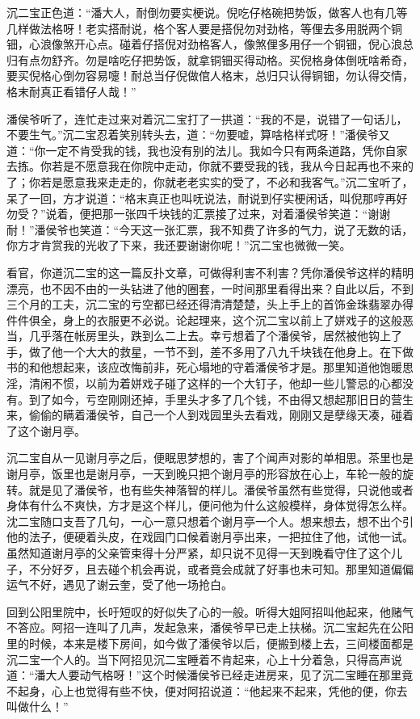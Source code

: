 \documentclass[12pt,UTF8]{ctexbook}
\begin{document}
{{{沉二宝正色道：“潘大人，耐倒勿要实梗说。倪吃仔格碗把势饭，做客人也有几等几样做法格呀！老实搭耐说，格个客人要是搭倪勿对劲格，等俚去多用脱两个铜钿，心浪像煞开心点。碰着仔搭倪对劲格客人，像煞俚多用仔一个铜钿，倪心浪总归有点勿舒齐。勿是啥吃仔把势饭，就拿铜钿买得动格。买倪格身体倒呒啥希奇，要买倪格心倒勿容易嚏！耐总当仔倪做倌人格末，总归只认得铜钿，勿认得交情，格末耐真正看错仔人哉！”

潘侯爷听了，连忙走过来对着沉二宝打了一拱道：“我的不是，说错了一句话儿，不要生气。”沉二宝忍着笑别转头去，道：“勿要嘘，算啥格样式呀！”潘侯爷又道：“你一定不肯受我的钱，我也没有别的法儿。我如今只有两条道路，凭你自家去拣。你若是不愿意我在你院中走动，你就不要受我的钱，我从今日起再也不来的了；你若是愿意我来走走的，你就老老实实的受了，不必和我客气。”沉二宝听了，呆了一回，方才说道：“格末真正也叫呒说法，耐说到仔实梗闲话，叫倪那哼再好勿受？”说着，便把那一张四千块钱的汇票接了过来，对着潘侯爷笑道：“谢谢耐！”潘侯爷也笑道：“今天这一张汇票，我不知费了许多的气力，说了无数的话，你方才肯赏我的光收了下来，我还要谢谢你呢！”沉二宝也微微一笑。

看官，你道沉二宝的这一篇反扑文章，可做得利害不利害？凭你潘侯爷这样的精明漂亮，也不因不由的一头钻进了他的圈套，一时间那里看得出来？自此以后，不到三个月的工夫，沉二宝的亏空都已经还得清清楚楚，头上手上的首饰金珠翡翠办得件件俱全，身上的衣服更不必说。论起理来，这个沉二宝以前上了姘戏子的这般恶当，几乎落在帐房里头，跌到么二上去。幸亏想着了个潘侯爷，居然被他钩上了手，做了他一个大大的救星，一节不到，差不多用了八九千块钱在他身上。在下做书的和他想起来，该应改悔前非，死心塌地的守着潘侯爷才是。那里知道他饱暖思淫，清闲不惯，以前为着姘戏子碰了这样的一个大钉子，他却一些儿警忌的心都没有。到了如今，亏空刚刚还掉，手里头才多了几个钱，不由得又想起那旧日的营生来，偷偷的瞒着潘侯爷，自己一个人到戏园里头去看戏，刚刚又是孽缘天凑，碰着了这个谢月亭。

沉二宝自从一见谢月亭之后，便眠思梦想的，害了个闻声对影的单相思。茶里也是谢月亭，饭里也是谢月亭，一天到晚只把个谢月亭的形容放在心上，车轮一般的旋转。就是见了潘侯爷，也有些失神落智的样儿。潘侯爷虽然有些觉得，只说他或者身体有什么不爽快，方才是这个样儿，便问他为什么这般模样，身体觉得怎么样。沈二宝随口支吾了几句，一心一意只想着个谢月亭一个人。想来想去，想不出个引他的法子，便硬着头皮，在戏园门口候着谢月亭出来，一把拉住了他，试他一试。虽然知道谢月亭的父亲管束得十分严紧，却只说不见得一天到晚看守住了这个儿子，不分好歹，且去碰个机会再说，或者竟会成就了好事也未可知。那里知道偏偏运气不好，遇见了谢云奎，受了他一场抢白。

回到公阳里院中，长吁短叹的好似失了心的一般。听得大姐阿招叫他起来，他赌气不答应。阿招一连叫了几声，发起急来，潘侯爷早已走上扶梯。沉二宝起先在公阳里的时候，本来是楼下房间，如今做了潘侯爷以后，便搬到楼上去，三间楼面都是沉二宝一个人的。当下阿招见沉二宝睡着不肯起来，心上十分着急，只得高声说道：“潘大人要动气格呀！”这个时候潘侯爷已经走进房来，见了沉二宝睡在那里竟不起身，心上也觉得有些不快，便对阿招说道：“他起来不起来，凭他的便，你去叫做什么！”

}}}
\end{document}
